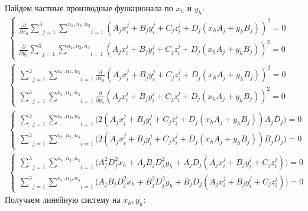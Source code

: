 Найдем частные производные функционала по $x_h$ и $y_h$:
$$\begin{gathered}
	\begin{cases}
		\frac{\partial}{\partial x_h} \underset{j=1}{\overset{3}{\sum}}\underset{i=1}{\overset{n_1, n_2, n_3}{\sum}}\left(A_j x_i^j + B_j y_i^j + C_j z_i^j + D_j(x_h A_j + y_h B_j)\right)^2 = 0 \\
		\frac{\partial}{\partial y_h} \underset{j=1}{\overset{3}{\sum}}\underset{i=1}{\overset{n_1, n_2, n_3}{\sum}}\left(A_j x_i^j + B_j y_i^j + C_j z_i^j + D_j(x_h A_j + y_h B_j)\right)^2 = 0
	\end{cases} \\
	\begin{cases}
		 \underset{j=1}{\overset{3}{\sum}}\underset{i=1}{\overset{n_1, n_2, n_3}{\sum}}\frac{\partial}{\partial x_h}\left(A_j x_i^j + B_j y_i^j + C_j z_i^j + D_j(x_h A_j + y_h B_j)\right)^2 = 0 \\
		 \underset{j=1}{\overset{3}{\sum}}\underset{i=1}{\overset{n_1, n_2, n_3}{\sum}}\frac{\partial}{\partial y_h}\left(A_j x_i^j + B_j y_i^j + C_j z_i^j + D_j(x_h A_j + y_h B_j)\right)^2 = 0
	\end{cases}\\
	\begin{cases}
		 \underset{j=1}{\overset{3}{\sum}}\underset{i=1}{\overset{n_1, n_2, n_3}{\sum}}\Bigg(2 \left(A_j x_i^j + B_j y_i^j + C_j z_i^j + D_j(x_h A_j + y_h B_j)\right) A_j D_j\Bigg) = 0 \\
		 \underset{j=1}{\overset{3}{\sum}}\underset{i=1}{\overset{n_1, n_2, n_3}{\sum}}\Bigg(2 \left(A_j x_i^j + B_j y_i^j + C_j z_i^j + D_j(x_h A_j + y_h B_j)\right) B_j D_j\Bigg) = 0
	\end{cases}\\
	\begin{cases}
		\underset{j=1}{\overset{3}{\sum}}\underset{i=1}{\overset{n_1, n_2, n_3}{\sum}}\Bigg( A_j^2 D_j^2 x_h + A_j B_j D_j^2 y_h + A_j D_j \left(  A_j x_i^j + B_j y_i^j + C_j z_i^j\right) \Bigg) = 0 \\
		\underset{j=1}{\overset{3}{\sum}}\underset{i=1}{\overset{n_1, n_2, n_3}{\sum}}\Bigg( A_j B_j D_j^2 x_h + B_j^2 D_j^2 y_h + B_j D_j \left( A_j x_i^j + B_j y_i^j + C_j z_i^j \right) \Bigg) = 0
	\end{cases}
\end{gathered}$$
\newpage
Получаем линейную систему на $x_h, y_h$:
